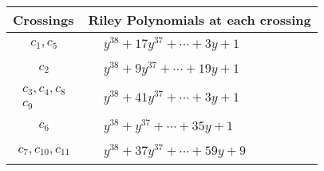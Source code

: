 \documentclass[1p]{elsarticle_modified}
\theoremstyle{definition}
\begin{document}
\begin{tabular}{m{50pt}|m{274pt}}
Crossings & \hspace{64pt}Riley Polynomials at each crossing \\
\hline $$\begin{aligned}c_{1},c_{5}\end{aligned}$$&$\begin{aligned}
&y^{38}+17 y^{37}+\cdots+3 y+1
\end{aligned}$\\
\hline $$\begin{aligned}c_{2}\end{aligned}$$&$\begin{aligned}
&y^{38}+9 y^{37}+\cdots+19 y+1
\end{aligned}$\\
\hline $$\begin{aligned}c_{3},c_{4},c_{8}\\c_{9}\end{aligned}$$&$\begin{aligned}
&y^{38}+41 y^{37}+\cdots+3 y+1
\end{aligned}$\\
\hline $$\begin{aligned}c_{6}\end{aligned}$$&$\begin{aligned}
&y^{38}+y^{37}+\cdots+35 y+1
\end{aligned}$\\
\hline $$\begin{aligned}c_{7},c_{10},c_{11}\end{aligned}$$&$\begin{aligned}
&y^{38}+37 y^{37}+\cdots+59 y+9
\end{aligned}$\\
\hline
\end{tabular}
\vskip 2pc
\end{document}
